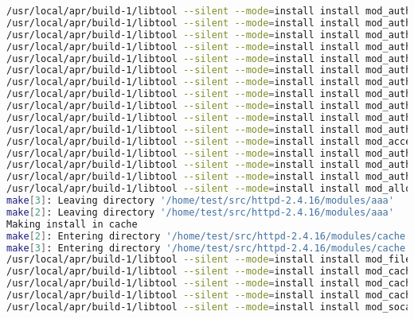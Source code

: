 \begin{lstlisting}[language=bash]
/usr/local/apr/build-1/libtool --silent --mode=install install mod_authn_anon.la /usr/local/apache2/modules/
/usr/local/apr/build-1/libtool --silent --mode=install install mod_authn_dbd.la /usr/local/apache2/modules/
/usr/local/apr/build-1/libtool --silent --mode=install install mod_authn_socache.la /usr/local/apache2/modules/
/usr/local/apr/build-1/libtool --silent --mode=install install mod_authn_core.la /usr/local/apache2/modules/
/usr/local/apr/build-1/libtool --silent --mode=install install mod_authz_host.la /usr/local/apache2/modules/
/usr/local/apr/build-1/libtool --silent --mode=install install mod_authz_groupfile.la /usr/local/apache2/modules/
/usr/local/apr/build-1/libtool --silent --mode=install install mod_authz_user.la /usr/local/apache2/modules/
/usr/local/apr/build-1/libtool --silent --mode=install install mod_authz_dbm.la /usr/local/apache2/modules/
/usr/local/apr/build-1/libtool --silent --mode=install install mod_authz_owner.la /usr/local/apache2/modules/
/usr/local/apr/build-1/libtool --silent --mode=install install mod_authz_dbd.la /usr/local/apache2/modules/
/usr/local/apr/build-1/libtool --silent --mode=install install mod_authz_core.la /usr/local/apache2/modules/
/usr/local/apr/build-1/libtool --silent --mode=install install mod_access_compat.la /usr/local/apache2/modules/
/usr/local/apr/build-1/libtool --silent --mode=install install mod_auth_basic.la /usr/local/apache2/modules/
/usr/local/apr/build-1/libtool --silent --mode=install install mod_auth_form.la /usr/local/apache2/modules/
/usr/local/apr/build-1/libtool --silent --mode=install install mod_auth_digest.la /usr/local/apache2/modules/
/usr/local/apr/build-1/libtool --silent --mode=install install mod_allowmethods.la /usr/local/apache2/modules/
make[3]: Leaving directory '/home/test/src/httpd-2.4.16/modules/aaa'
make[2]: Leaving directory '/home/test/src/httpd-2.4.16/modules/aaa'
Making install in cache
make[2]: Entering directory '/home/test/src/httpd-2.4.16/modules/cache'
make[3]: Entering directory '/home/test/src/httpd-2.4.16/modules/cache'
/usr/local/apr/build-1/libtool --silent --mode=install install mod_file_cache.la /usr/local/apache2/modules/
/usr/local/apr/build-1/libtool --silent --mode=install install mod_cache.la /usr/local/apache2/modules/
/usr/local/apr/build-1/libtool --silent --mode=install install mod_cache_disk.la /usr/local/apache2/modules/
/usr/local/apr/build-1/libtool --silent --mode=install install mod_cache_socache.la /usr/local/apache2/modules/
/usr/local/apr/build-1/libtool --silent --mode=install install mod_socache_shmcb.la /usr/local/apache2/modules/

\end{lstlisting}
